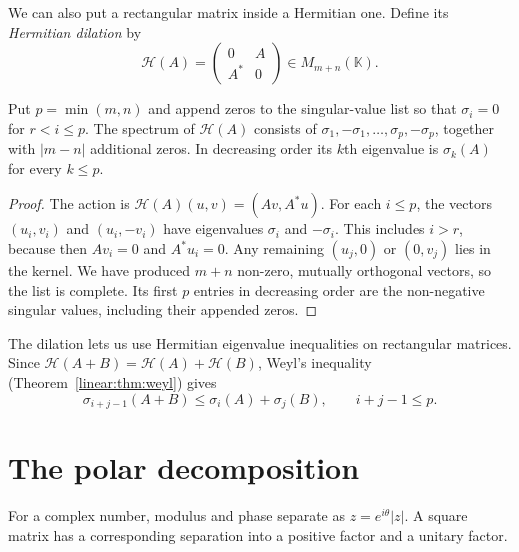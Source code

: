 We can also put a rectangular matrix inside a Hermitian one. Define its \emph{Hermitian dilation} by
\[
\mathcal H(A)=\begin{pmatrix}0&A\\A^*&0\end{pmatrix}\in M_{m+n}(\mathbb K).
\]

\begin{proposition}\label{linear:prop:dilation}
Put $p=\min(m,n)$ and append zeros to the singular-value list so that $\sigma_i=0$ for $r<i\le p$. The spectrum of $\mathcal H(A)$ consists of $\sigma_1,-\sigma_1,\ldots,\sigma_p,-\sigma_p$, together with $|m-n|$ additional zeros. In decreasing order its $k$th eigenvalue is $\sigma_k(A)$ for every $k\le p$.
\end{proposition}
\begin{proof}
The action is $\mathcal H(A)(u,v)=(Av,A^*u)$. For each $i\le p$, the vectors $(u_i,v_i)$ and $(u_i,-v_i)$ have eigenvalues $\sigma_i$ and $-\sigma_i$. This includes $i>r$, because then $Av_i=0$ and $A^*u_i=0$. Any remaining $(u_j,0)$ or $(0,v_j)$ lies in the kernel. We have produced $m+n$ non-zero, mutually orthogonal vectors, so the list is complete. Its first $p$ entries in decreasing order are the non-negative singular values, including their appended zeros.
\end{proof}

The dilation lets us use Hermitian eigenvalue inequalities on rectangular matrices. Since $\mathcal H(A+B)=\mathcal H(A)+\mathcal H(B)$, Weyl's inequality (Theorem~\ref{linear:thm:weyl}) gives
\begin{equation}\label{linear:eq:weylsv}
\sigma_{i+j-1}(A+B)\le\sigma_i(A)+\sigma_j(B),\qquad i+j-1\le p.
\end{equation}

\section{The polar decomposition}

For a complex number, modulus and phase separate as $z=e^{i\theta}|z|$. A square matrix has a corresponding separation into a positive factor and a unitary factor.

